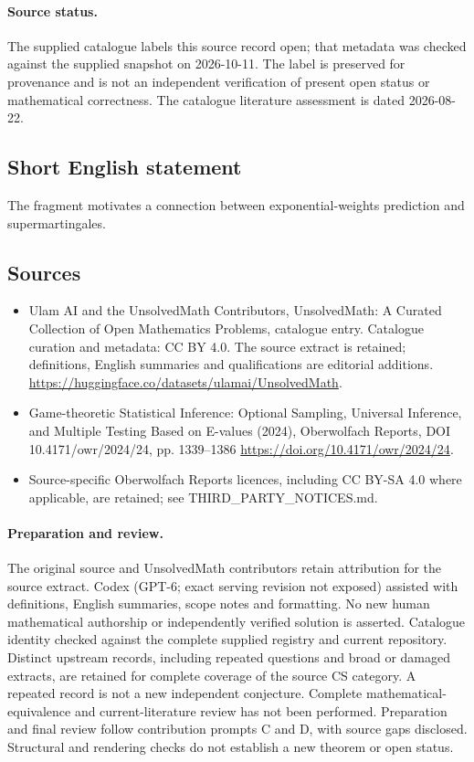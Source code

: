 \documentclass[11pt]{article}
\begin{document}
\paragraph{Source status.}
The supplied catalogue labels this source record open; that metadata was checked against the supplied snapshot on 2026-10-11. The label is preserved for provenance and is not an independent verification of present open status or mathematical correctness. The catalogue literature assessment is dated 2026-08-22.
\subsection{Short English statement}
The fragment motivates a connection between exponential-weights prediction and supermartingales.
\subsection{Sources}
\begin{itemize}
\item[\hypertarget{source:statement:1}{S1}] Ulam AI and the UnsolvedMath Contributors, UnsolvedMath: A Curated Collection of Open Mathematics Problems, catalogue entry. Catalogue curation and metadata: CC BY 4.0. The source extract is retained; definitions, English summaries and qualifications are editorial additions.
\url{https://huggingface.co/datasets/ulamai/UnsolvedMath}.
\item[\hypertarget{source:statement:2}{S2}] Game-theoretic Statistical Inference: Optional Sampling, Universal Inference, and Multiple Testing Based on E-values (2024), Oberwolfach Reports, DOI 10.4171/owr/2024/24, pp. 1339--1386
\url{https://doi.org/10.4171/owr/2024/24}.
\item Source-specific Oberwolfach Reports licences, including CC BY-SA 4.0 where applicable, are retained; see THIRD\_PARTY\_NOTICES.md.
\end{itemize}
\paragraph{Preparation and review.}
The original source and UnsolvedMath contributors retain attribution for the source extract. Codex (GPT-6; exact serving revision not exposed) assisted with definitions, English summaries, scope notes and formatting. No new human mathematical authorship or independently verified solution is asserted. Catalogue identity checked against the complete supplied registry and current repository. Distinct upstream records, including repeated questions and broad or damaged extracts, are retained for complete coverage of the source CS category. A repeated record is not a new independent conjecture. Complete mathematical-equivalence and current-literature review has not been performed. Preparation and final review follow contribution prompts C and D, with source gaps disclosed. Structural and rendering checks do not establish a new theorem or open status.
\label{end:statement}
\end{document}
